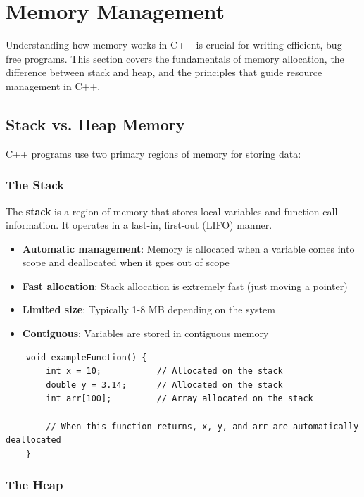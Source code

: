 \section{Memory Management}

Understanding how memory works in C++ is crucial for writing efficient, bug-free programs. This section covers the fundamentals of memory allocation, the difference between stack and heap, and the principles that guide resource management in C++.

\subsection{Stack vs. Heap Memory}

C++ programs use two primary regions of memory for storing data:

\subsubsection{The Stack}

The \textbf{stack} is a region of memory that stores local variables and function call information. It operates in a last-in, first-out (LIFO) manner.

\begin{itemize}
	\item \textbf{Automatic management}: Memory is allocated when a variable comes into scope and deallocated when it goes out of scope
	\item \textbf{Fast allocation}: Stack allocation is extremely fast (just moving a pointer)
	\item \textbf{Limited size}: Typically 1-8 MB depending on the system
	\item \textbf{Contiguous}: Variables are stored in contiguous memory
\end{itemize}

\begin{lstlisting}
	void exampleFunction() {
		int x = 10;           // Allocated on the stack
		double y = 3.14;      // Allocated on the stack
		int arr[100];         // Array allocated on the stack
		
		// When this function returns, x, y, and arr are automatically deallocated
	}
\end{lstlisting}

\subsubsection{The Heap}


